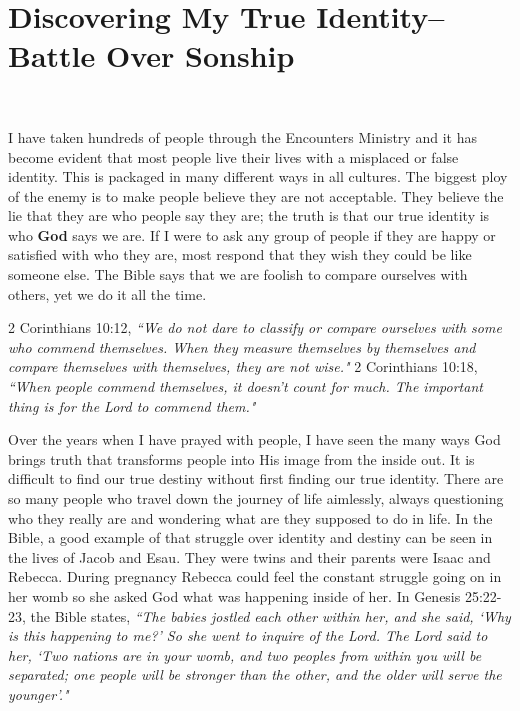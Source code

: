 \documentclass[oneside]{book}
\begin{document}
\chapter{Discovering My True Identity--Battle Over Sonship}
\

I have taken hundreds of people through the Encounters Ministry and it has become evident that most people live their lives with a misplaced or false identity. This is packaged in many different ways in all cultures. The biggest ploy of the enemy is to make people believe they are not acceptable. They believe the lie that they are who people say they are; the truth is that our true identity is who \textbf{God} says we are. If I were to ask any group of people if they are happy or satisfied with who they are, most respond that they wish they could be like someone else. The Bible says that we are foolish to compare ourselves with others, yet we do it all the time.

2 Corinthians 10:12, \textit{``We do not dare to classify or compare ourselves with some who commend themselves. When they measure themselves by themselves and compare themselves with themselves, they are not wise."}
2 Corinthians 10:18, \textit{``When people commend themselves, it doesn't count for much. The important thing is for the Lord to commend them."}

Over the years when I have prayed with people, I have seen the many ways God brings truth that transforms people into His image from the inside out. It is difficult to find our true destiny without first finding our true identity. There are so many people who travel down the journey of life aimlessly, always questioning who they really are and wondering what are they supposed to do in life. In the Bible, a good example of that struggle over identity and destiny can be seen in the lives of Jacob and Esau. They were twins and their parents were Isaac and Rebecca. During pregnancy Rebecca could feel the constant struggle going on in her womb so she asked God what was happening inside of her. In Genesis 25:22-23, the Bible states, \textit{``The babies jostled each other within her, and she said, `Why is this happening to me?' So she went to inquire of the Lord. The Lord said to her, `Two nations are in your womb, and two peoples from within you will be separated; one people will be stronger than the other, and the older will serve the younger'."}
\end{document}
